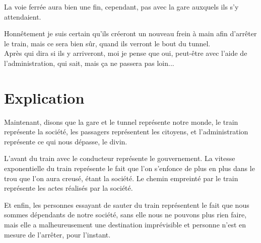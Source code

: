 \documentclass[twocolumn, french]{article}
\begin{document}
La voie ferrée aura bien une fin, cependant, pas avec la gare auxquels ils s'y attendaient.

Honnêtement je suis certain qu'ils créeront un nouveau frein à main afin d'arrêter le train, mais ce sera bien 
sûr, quand ils verront le bout du tunnel. \\
Après qui dira si ils y arriveront, moi je pense que oui, peut-être avec l'aide de l'administration, qui sait, mais 
ça ne passera pas loin...
\section*{Explication}
Maintenant, disons que la gare et le tunnel représente notre monde, le train représente la société, les 
passagers représentent les citoyens, et l'administration représente ce qui nous dépasse, le divin.

L'avant du train avec le conducteur représente le gouvernement. La vitesse exponentielle du train représente le fait 
que l'on s'enfonce de plus en plus dans le trou que l'on aura creusé, étant la société. Le chemin empreinté par le 
train représente les actes réalisés par la société.

Et enfin, les personnes essayant de sauter du train représentent le fait que nous sommes dépendants de notre société, 
sans elle nous ne pouvons plus rien faire, mais elle a malheureusement une destination imprévisible et personne n'est 
en mesure de l'arrêter, pour l'instant.
\end{document}
